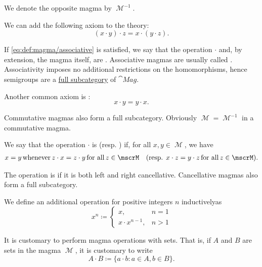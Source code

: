 \begin{definition}
\begin{thmenum}
    We denote the opposite magma by \( \mscrM^{-1} \).

     We can add the following axiom to the theory:
    \begin{equation}\label{eq:def:magma/associative}
      (x \cdot y) \cdot z = x \cdot (y \cdot z).
    \end{equation}

    If \eqref{eq:def:magma/associative} is satisfied, we say that the operation \( \cdot \) and, by extension, the magma itself, are . Associative magmas are usually called . Associativity imposes no additional restrictions on the homomorphisms, hence semigroups are a \hyperref[def:subcategory]{full subcategory} of \( \cat{Mag} \).

     Another common axiom is :
    \begin{equation}\label{eq:def:magma/commutative}
      x \cdot y = y \cdot x.
    \end{equation}

    Commutative magmas also form a full subcategory. Obviously \( \mscrM = \mscrM^{-1} \) in a commutative magma.

     We say that the operation \( \cdot \) is  (resp. ) if, for all \( x, y \in \mscrM \), we have
    \begin{align}\label{eq:def:magma/cancellative}
      x = y \T{whenever} z \cdot x = z \cdot y \T{for all} z \in \mscrM
      &&
      (\text{resp. } x \cdot z = y \cdot z \T{for all} z \in \mscrM).
    \end{align}

    The operation is  if it is both left and right cancellative. Cancellative magmas also form a full subcategory.

     We define an additional  operation for positive integers \( n \) inductively\IND as
    \begin{equation}\label{eq:def:magma/exponentiation}
      x^n \coloneqq \begin{cases}
        x,               & n = 1 \\
        x \cdot x^{n-1}, & n > 1
      \end{cases}
    \end{equation}

     It is customary to perform magma operations with sets. That is, if \( A \) and \( B \) are sets in the magma \( \mscrM \), it is customary to write
    \begin{equation*}
      A \cdot B \coloneqq \{ a \cdot b \colon a \in A, b \in B \}.
    \end{equation*}


\end{thmenum}
\end{definition}
